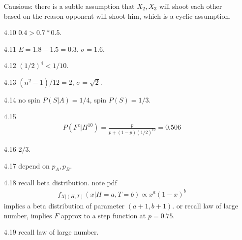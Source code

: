 \documentclass[paper=a4, fontsize=11pt]{scrartcl} %
\numberwithin{equation}{section} %
\numberwithin{figure}{section} %
\numberwithin{table}{section} %
\begin{document}
\begin{itemize}
	Causious: there is a subtle assumption that $X_2,X_3$ will shoot each other based on the reason opponent will shoot him, which is a cyclic assumption.
	\item[4.10] $0.4>0.7*0.5$.
	\item[4.11] $E=1.8-1.5=0.3$, $\sigma = 1.6$.
	\item[4.12] $(1/2)^4 < 1/10$.
	\item[4.13] $(n^2-1)/12 = 2$, $\sigma=\sqrt{2}$.
	\item[4.14] no spin $P(S|A)= 1/4$, spin $P(S)=1/3$.
	\item[4.15]
	\begin{align}
		P(F^c| H^{10}) =  \frac{p}{p + (1-p) (1/2)^{10}}= 0.506
	\end{align}
	\item[4.16] $2/3$.
	\item[4.17] depend on $p_A,p_B$.
	\item[4.18] recall beta distribution. note pdf
	\begin{align}
		f_{X|(H,T)}(x| H=a,T=b) \propto x^a (1-x)^b
	\end{align}
	implies a beta distribution of parameter $(a+1,b+1)$. or recall law of large number, implies $F$ approx to a step function at $p=0.75$.
	\item[4.19] recall law of large number.
\end{itemize}
\end{document}
